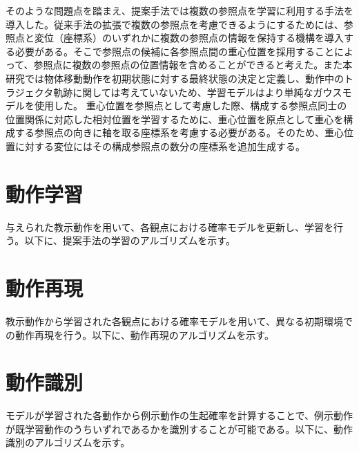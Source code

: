 そのような問題点を踏まえ、提案手法では複数の参照点を学習に利用する手法を導入した。従来手法の拡張で複数の参照点を考慮できるようにするためには、参照点と変位（座標系）のいずれかに複数の参照点の情報を保持する機構を導入する必要がある。そこで参照点の候補に各参照点間の重心位置を採用することによって、参照点に複数の参照点の位置情報を含めることができると考えた。また本研究では物体移動動作を初期状態に対する最終状態の決定と定義し、動作中のトラジェクタ軌跡に関しては考えていないため、学習モデルはより単純なガウスモデルを使用した。
重心位置を参照点として考慮した際、構成する参照点同士の位置関係に対応した相対位置を学習するために、重心位置を原点として重心を構成する参照点の向きに軸を取る座標系を考慮する必要がある。そのため、重心位置に対する変位にはその構成参照点の数分の座標系を追加生成する。

\section{動作学習}

与えられた教示動作を用いて、各観点における確率モデルを更新し、学習を行う。以下に、提案手法の学習のアルゴリズムを示す。



\section{動作再現}

教示動作から学習された各観点における確率モデルを用いて、異なる初期環境での動作再現を行う。以下に、動作再現のアルゴリズムを示す。

\section{動作識別}

モデルが学習された各動作から例示動作の生起確率を計算することで、例示動作が既学習動作のうちいずれであるかを識別することが可能である。以下に、動作識別のアルゴリズムを示す。
